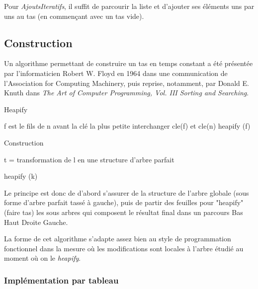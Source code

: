 \documentclass[12pt,a4paper]{article}
\begin{document}
Pour \textit{AjoutsIteratifs}, il suffit de parcourir la liste et d'ajouter ses éléments uns par uns au tas (en commençant avec un tas vide).

\subsection{Construction}

Un algorithme permettant de construire un tas en temps constant a été présentée par l'informaticien Robert W. Floyd en 1964 dans une communication de l'Association for Computing Machinery\cite{ACM}, puis reprise, notamment, par Donald E. Knuth dans \textit{The Art of Computer Programming, Vol. III Sorting and Searching}\cite{KnuthHeap}.


\begin{algorithm}
\caption{Heapify}
\begin{algorithmic}
 	\STATE f est le fils de n avant la clé la plus petite
 	\STATE interchanger cle(f) et cle(n)
 	\STATE heapify (f)
\ENDIF
\end{algorithmic}
\end{algorithm}

\begin{algorithm}
\caption{Construction}
\begin{algorithmic}
\STATE t = transformation de l en une structure d'arbre parfait


\STATE heapify (k)
	
\ENDFOR
\end{algorithmic}
\end{algorithm}

Le principe est donc de d'abord s'assurer de la structure de l'arbre globale (sous forme d'arbre parfait tassé à gauche), puis de partir des feuilles pour "heapify" (faire tas) les sous arbres qui composent le résultat final dans un parcours Bas Haut Droite Gauche.

La forme de cet algorithme s'adapte assez bien au style de programmation fonctionnel dans la mesure où les modifications sont locales à l'arbre étudié au moment où on le \textit{heapify}.


\subsubsection{Implémentation par tableau}
\end{document}
